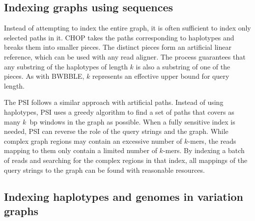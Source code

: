\subsection{Indexing graphs using sequences}

Instead of attempting to index the entire graph, it is often sufficient to index only selected paths in it.
CHOP \cite{Mokveld_2018} takes the paths corresponding to haplotypes and breaks them into smaller pieces.
The distinct pieces form an artificial linear reference, which can be used with any read aligner.
The process guarantees that any substring of the haplotypes of length $k$ is also a substring of one of the pieces.
As with BWBBLE, $k$ represents an effective upper bound for query length.

The PSI \cite{Ghaffaari_2019} follows a similar approach with artificial paths.
Instead of using haplotypes, PSI uses a greedy algorithm to find a set of paths that covers as many $k$~bp windows in the graph as possible.
When a fully sensitive index is needed, PSI can reverse the role of the query strings and the graph.
While complex graph regions may contain an excessive number of $k$-mers, the reads mapping to them only contain a limited number of $k$-mers.
By indexing a batch of reads and searching for the complex regions in that index, all mappings of the query strings to the graph can be found with reasonable resources.

\subsection{Indexing haplotypes and genomes in variation graphs}


